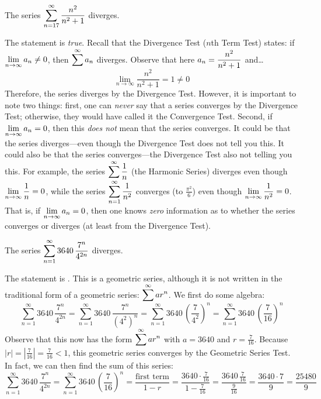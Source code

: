 \documentclass[11pt,letterpaper]{article}
\begin{document}
 The series $\displaystyle\sum_{n=17}^\infty \dfrac{n^2}{n^2 + 1}$ diverges. \pspace

\sol The statement is \textit{true}. Recall that the Divergence Test ($n$th Term Test) states: if $\displaystyle\lim_{n \to \infty} a_n \neq 0$, then $\displaystyle\sum^\infty a_n$ diverges. Observe that here $\displaystyle a_n= \dfrac{n^2}{n^2 + 1}$ and\dots
	\[
	\lim_{n \to \infty} \dfrac{n^2}{n^2 + 1}= 1 \neq 0
	\]
Therefore, the series diverges by the Divergence Test. However, it is important to note two things: first, one can \textit{never} say that a series converges by the Divergence Test; otherwise, they would have called it the Convergence Test. Second, if $\displaystyle\lim_{n \to \infty} a_n= 0$, then this \textit{does not} mean that the series converges. It could be that the series diverges---even though the Divergence Test does not tell you this. It could also be that the series converges---the Divergence Test also not telling you this. For example, the series $\displaystyle\sum^\infty \dfrac{1}{n}$ (the Harmonic Series) diverges even though $\displaystyle\lim_{n \to \infty} \dfrac{1}{n}= 0$, while the series $\displaystyle\sum_{n=1}^\infty \dfrac{1}{n^2}$ converges (to $\frac{\pi^2}{6}$) even though $\displaystyle\lim_{n \to \infty} \dfrac{1}{n^2}= 0$. That is, if $\displaystyle\lim_{n \to \infty} a_n= 0$, then one knows \textit{zero} information as to whether the series converges or diverges (at least from the Divergence Test). \pvspace{1.3cm}



 The series $\displaystyle\sum_{n=1}^\infty 3640 \, \dfrac{7^n}{4^{2n}}$ diverges. \pspace

\sol The statement is . This is a geometric series, although it is not written in the traditional form of a geometric series: $\displaystyle\sum^\infty a r^n$. We first do some algebra:
	\[
	\sum_{n=1}^\infty 3640 \, \dfrac{7^n}{4^{2n}}= \sum_{n=1}^\infty 3640 \, \dfrac{7^n}{(4^2)^n}= \sum_{n=1}^\infty 3640 \, \left( \dfrac{7}{4^2} \right)^n= \sum_{n=1}^\infty 3640 \, \left( \dfrac{7}{16} \right)^n
	\]
Observe that this now has the form $\displaystyle\sum^\infty a r^n$ with $a= 3640$ and $r= \frac{7}{16}$. Because $|r|= \left| \frac{7}{16} \right|= \frac{7}{16} < 1$, this geometric series converges by the Geometric Series Test. In fact, we can then find the sum of this series:
	\[
	\sum_{n=1}^\infty 3640 \, \dfrac{7^n}{4^{2n}}= \sum_{n=1}^\infty 3640 \, \left( \dfrac{7}{16} \right)^n= \dfrac{\text{first term}}{1 - r}= \dfrac{3640 \cdot \frac{7}{16}}{1 - \frac{7}{16}}= \dfrac{3640\, \frac{7}{16}}{\frac{9}{16}}= \dfrac{3640 \cdot 7}{9}= \dfrac{25480}{9}
	\] \pvspace{1.3cm}
\end{document}
